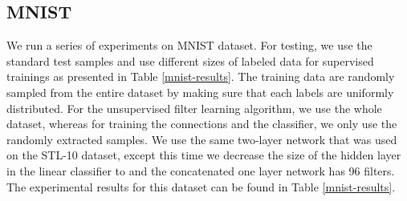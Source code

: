 \documentclass{article} \usepackage{iclr2016_workshop,times}
\begin{document}
\subsection{MNIST}
We run a series of experiments on MNIST dataset. For testing, we use the standard  test samples and use different sizes of labeled data for supervised trainings as presented in Table \ref{mnist-results}. The training data are randomly sampled from the entire dataset by making sure that each labels are uniformly distributed.
For the unsupervised filter learning algorithm, we use the whole dataset, whereas for training the connections and the classifier, we only use the randomly extracted samples.
We use the same two-layer network that was used on the STL-10 dataset, except this time we decrease the size of the hidden layer in the linear classifier to  and the concatenated one layer network has 96 filters. The experimental results for this dataset can be found in Table \ref{mnist-results}.
\end{document}
